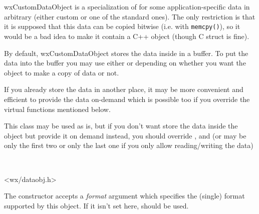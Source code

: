 \section{}\label{wxcustomdataobject}

wxCustomDataObject is a specialization of
 for some
application-specific data in arbitrary (either custom or one of the standard
ones). The only restriction is that it is supposed that this data can be
copied bitwise (i.e. with {\tt memcpy()}), so it would be a bad idea to make
it contain a C++ object (though C struct is fine).

By default, wxCustomDataObject stores the data inside in a buffer. To put the
data into the buffer you may use either
 or
 depending on whether you want
the object to make a copy of data or not.

If you already store the data in another place, it may be more convenient and
efficient to provide the data on-demand which is possible too if you override
the virtual functions mentioned below.


This class may be used as is, but if you don't want store the data inside the
object but provide it on demand instead, you should override
,
 and
 (or may be only the first two or
only the last one if you only allow reading/writing the data)


\\


<wx/dataobj.h>




\label{wxcustomdataobjectwxcustomdataobject}


The constructor accepts a {\it format} argument which specifies the (single)
format supported by this object. If it isn't set here,
 should be used.

